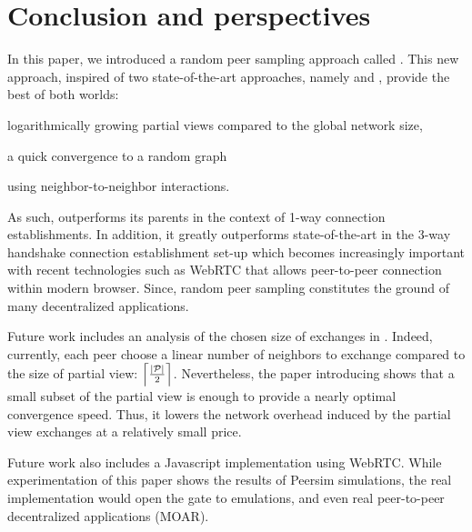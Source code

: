 
\section{Conclusion and perspectives}
\label{sec:conclusion}

In this paper, we introduced a random peer sampling approach called
\SCAMPLON{}.  This new approach, inspired of two state-of-the-art approaches,
namely \SCAMP{} and \CYCLON{}, provide the best of both worlds:
\begin{inparaenum}[(i)]
\item logarithmically growing partial views compared to the global network
  size,
\item a quick convergence to a random graph
\item using neighbor-to-neighbor interactions.
\end{inparaenum}
As such, \SCAMPLON{} outperforms its parents in the context of 1-way connection
establishments. In addition, it greatly outperforms state-of-the-art in the
3-way handshake connection establishment set-up which becomes increasingly
important with recent technologies such as WebRTC that allows peer-to-peer
connection within modern browser. Since, random peer sampling constitutes the
ground of many decentralized applications.

Future work includes an analysis of the chosen size of exchanges in
\SCAMPLON{}. Indeed, currently, each peer choose a linear number of neighbors
to exchange compared to the size of partial view:
$\left\lceil |\mathcal{P}|\over{2} \right\rceil$. Nevertheless, the paper
introducing \CYCLON{} shows that a small subset of the partial view is enough
to provide a nearly optimal convergence speed. Thus, it lowers the network
overhead induced by the partial view exchanges at a relatively small price.

Future work also includes a Javascript implementation using WebRTC. While
experimentation of this paper shows the results of Peersim simulations, the
real implementation would open the gate to emulations, and even real
peer-to-peer decentralized applications (MOAR).

